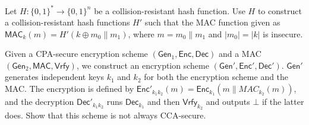 \documentclass[a4paper,10pt,landscape,twocolumn]{scrartcl}
\begin{document}
\begin{exercise}[HMAC?]
  Let $H: \{0,1\}^*\to \{0,1\}^n$ be a collision-resistant hash function. Use $H$ to construct a collision-resistant hash functions $H'$ such that the MAC function given as $\mathsf{MAC}_k(m)=H'(k\oplus m_0\|m_1)$, where $m=m_0\|m_1$ and $|m_0|=|k|$ is insecure.
\end{exercise}

\begin{exercise}

Given a CPA-secure encryption scheme $(\mathsf{Gen}_1, \mathsf{Enc}, \mathsf{Dec})$ and a MAC $(\mathsf{Gen}_2, \mathsf{MAC}, \mathsf{Vrfy})$, we construct an encryption scheme $(\mathsf{Gen}', \mathsf{Enc}', \mathsf{Dec}')$. $\mathsf{Gen}'$ generates independent keys $k_1$ and $k_2$ for both the encryption scheme and the MAC. The encryption is defined by $\mathsf{Enc}'_{k_1k_2}(m)=\mathsf{Enc}_{k_1}(m\|MAC_{k_2}(m))$, and the decryption $\mathsf{Dec}'_{k_1k_2}$ runs $\mathsf{Dec}_{k_1}$ and then $\mathsf{Vrfy}_{k_2}$ and outputs $\bot$ if the latter does. Show that this scheme is not always CCA-secure.


\end{exercise}

%
\end{document}
